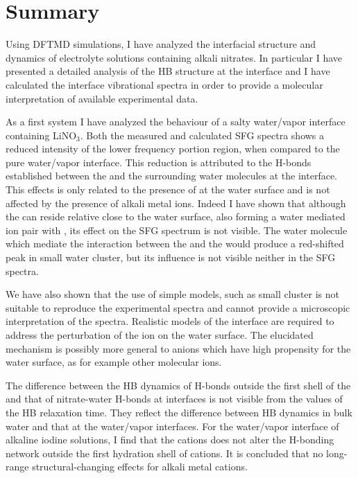 \chapter{Summary}\label{CHAPTER_Summary}
Using DFTMD simulations, I have analyzed the interfacial structure and dynamics of electrolyte solutions containing alkali nitrates.
In particular I have presented a detailed analysis of the HB structure at the interface and I have calculated the interface vibrational spectra
in order to provide a molecular interpretation of available experimental data. 

As a first system I have analyzed the behaviour of a salty water/vapor interface containing LiNO$_3$.
Both the measured and calculated SFG spectra shows a reduced intensity of the lower frequency portion region, 
when compared to the pure water/vapor interface. 
This reduction is attributed to the H-bonds established between the \nitrate and the surrounding water molecules at the interface.
This effects is only related to the presence of \nitrate at the water surface and is not affected by the presence of alkali metal ions.
Indeed I have shown that although the \Li can reside relative close to the water surface, also forming a water mediated
ion pair with \nit, its effect on the SFG spectrum is not visible. The water molecule which mediate the interaction 
between the \nitrate and the \Li would produce a red-shifted peak in small water cluster, but its influence is not visible 
neither in the SFG spectra. 

We have also shown that the use of simple models, such as small cluster is not suitable to reproduce the experimental spectra and cannot provide a microscopic interpretation of the spectra. 
Realistic models of the interface are required to address the perturbation of the ion on the water surface.
The elucidated mechanism is possibly more general to anions which have high propensity for the water surface,
as for example other molecular ions.

The difference between the HB dynamics of H-bonds outside the first shell of the \Li and that of nitrate-water H-bonds 
at interfaces is not visible from the values of the HB relaxation time. They reflect the difference between HB dynamics in bulk water and that at the water/vapor interfaces.
For the water/vapor interface of alkaline iodine solutions, I find that the cations does not alter the H-bonding network outside the first hydration shell of cations. 
It is concluded that no long-range structural-changing effects for alkali metal cations.

